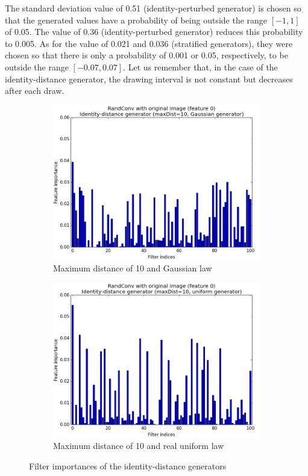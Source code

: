 \documentclass[a4paper]{report}
\begin{document}
	The standard deviation value of 0.51 (identity-perturbed generator) is chosen so that the generated values have a probability of being outside the range $[-1, 1]$ of 0.05. The value of 0.36 (identity-perturbed generator) reduces this probability to 0.005. As for the value of 0.021 and 0.036 (stratified generators), they were chosen so that there is only a probability of 0.001 or 0.05, respectively, to be outside the range $[-0.07, 0.07]$. Let us remember that, in the case of the identity-distance generator, the drawing interval is not constant but decreases after each draw.
	
	\begin{figure}
		\begin{subfigure}{.5\textwidth}
			\centering
			\includegraphics[width=1.\linewidth]{images/FIIdDistGauss.png}
			\caption{\label{fig:FIIdDistGauss}Maximum distance of 10 and Gaussian law}
		\end{subfigure}%
		\begin{subfigure}{.5\textwidth}
			\centering
			\includegraphics[width=1.\linewidth]{images/FIIdDistRU.png}
			\caption{\label{fig:FIIdDistRU}Maximum distance of 10 and real uniform law}
		\end{subfigure}
		\caption{\label{fig:FIIdDist}Filter importances of the identity-distance generators}
	\end{figure}
	
\end{document}
